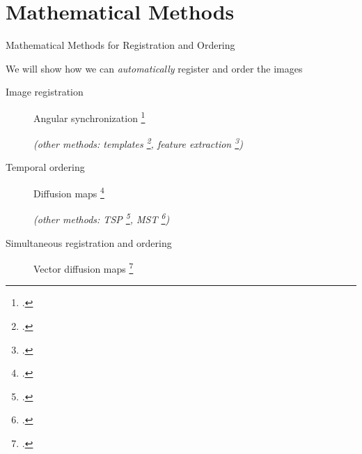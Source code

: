 \documentclass[10pt,aspectratio=169]{beamer}
\begin{document}
\section{Mathematical Methods}

\begin{frame}{Mathematical Methods for Registration and Ordering}

\vspace{-0.1in}
\begin{center}
We will show how we can {\em automatically} register and order the images
\vspace{-0.05in}
\end{center}

\vspace{-0.1in}
{\small 
\begin{description}
\item[Image registration] Angular synchronization \footcite{ singer2011angular}
{\scriptsize \em (other methods: templates \footcite{ahuja2007template}, feature extraction \footcite{zhao2003face, schindler2007inferring}) \par}

\item[Temporal ordering] Diffusion maps \footcite{coifman2005geometric} 
{\scriptsize \em (other methods: TSP \footcite{anavy2014blind}, MST \footcite{trapnell2014dynamics}) \par}

\item[Simultaneous registration and ordering] Vector diffusion maps \footcite{singer2012vector} 

\end{description}
 \par}
 
\end{frame}
\end{document}
